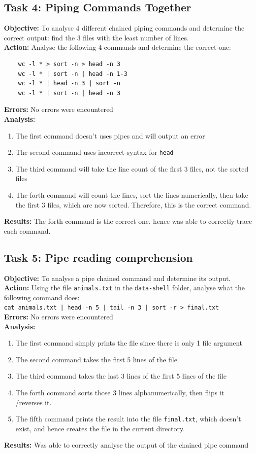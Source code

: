 \documentclass{article}
\begin{document}
\subsection{Task 4: Piping Commands Together}
%
\textbf{Objective:} To analyse 4 different chained piping commands and determine the correct output: find the 3 files with the least number of lines.\\
\textbf{Action:} Analyse the following 4 commands and determine the correct one:
\begin{verbatim}
    wc -l * > sort -n > head -n 3
    wc -l * | sort -n | head -n 1-3
    wc -l * | head -n 3 | sort -n
    wc -l * | sort -n | head -n 3
\end{verbatim}
\textbf{Errors:} No errors were encountered\\
\textbf{Analysis:}
\begin{enumerate}
    \item The first command doesn't uses pipes and will output an error
    \item The second command uses incorrect syntax for \texttt{head}
    \item The third command will take the line count of the first 3 files, not the sorted files
    \item The forth command will count the lines, sort the lines numerically, then take the first 3 files, which are now sorted. Therefore, this is the correct command.
\end{enumerate}
\textbf{Results:} The forth command is the correct one, hence was able to correctly trace each command.
%
\subsection{Task 5: Pipe reading comprehension}
%
\textbf{Objective:} To analyse a pipe chained command and determine its output.
\textbf{Action:} Using the file \verb|animals.txt| in the \texttt{data-shell} folder, analyse what the following command does:\\
\texttt{cat animals.txt | head -n 5 | tail -n 3 | sort -r > final.txt}\\
\textbf{Errors:} No errors were encountered\\
\textbf{Analysis:}
\begin{enumerate}
    \item The first command simply prints the file since there is only 1 file argument
    \item The second command takes the first 5 lines of the file
    \item The third command takes the last 3 lines of the first 5 lines of the file
    \item The forth command sorts those 3 lines alphanumerically, then flips it\\/reverses it.
    \item The fifth command prints the result into the file \texttt{final.txt}, which doesn't exist, and hence creates the file in the current directory.
\end{enumerate}
\textbf{Results:} Was able to correctly analyse the output of the chained pipe command
%
\end{document}
